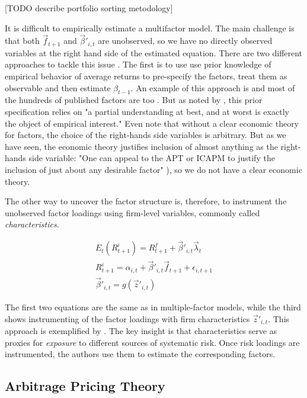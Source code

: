 			[TODO describe portfolio sorting metodology]
			
			It is difficult to empirically estimate a multifactor model. The main challenge is that both $\vec{f}_{t+1}$ and $\vec{\beta}'_{i,t}$ are unobserved, so we have no directly observed variables at the right hand side of the estimated equation. There are two different approaches to tackle this issue \citep{kelly2019characteristics}. The first is to use use prior knowledge of empirical behavior of average returns to pre-specify the factors, treat them as observable and then estimate $\beta_{t-1}$. An example of this approach is \citep{fama1993common} and most of the hundreds of published factors are too \cite{cochrane2009asset}. But as noted by \cite[p.~3]{kelly2019characteristics}, this prior specification relies on "a partial understanding at best, and at worst is exactly the object of empirical interest."  Even \cite{fama1993common} note that without a clear economic theory for factors, the choice of the right-hands side variables is arbitrary. But as we have seen, the economic theory justifies inclusion of almost anything as the right-hands side variable: "One can appeal to the APT or ICAPM to justify the inclusion of just about any desirable factor" \citep[p.~124]{cochrane2009asset}), so we do not have a clear economic theory.  
			
			The other way to uncover the factor structure is, therefore, to instrument the unobserved factor loadings using firm-level variables, commonly called \textit{characteristics}.  
			
			\begin{align}
				E_t(R^i_{t+1}) = R^f_{t+1} + \vec{\beta}'_{i,t} \vec{\lambda}_{t}  \label{ER_betalambda} \\
				R^i_{t+1} = \alpha_{i,t} + \vec{\beta}'_{i,t} \vec{f}_{t+1} + \epsilon_{i,t+1} \\
				\vec{\beta}'_{i,t} = g(\vec{z}'_{i,t}) \label{instrumented_betas}
			\end{align}
			
			The first two equations are the same as in multiple-factor models, while the third shows instrumenting of the factor loadings with firm characteristics $\vec{z}'_{i,t}$. This approach is exemplified by \cite{kelly2019characteristics}. The key insight is that characteristics serve as proxies for \textit{exposure} to different sources of systematic risk. Once risk loadings are instrumented, the authors use them to estimate the corresponding factors.
	
		\subsection{Arbitrage Pricing Theory}
		
